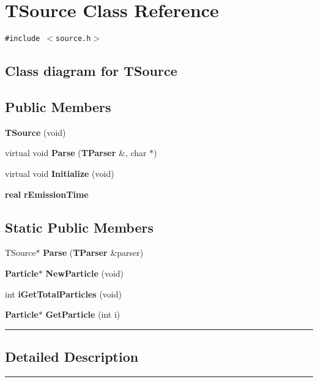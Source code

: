 \section{TSource  Class Reference}
\label{TSource}


{\tt \#include $<$source.h$>$}

\subsection*{Class diagram for TSource}
\begin{figure}[H]
\begin{center}
\leavevmode
\setlength{\epsfysize}{3cm}
\end{center}
\end{figure}
\subsection*{Public Members}
\begin{CompactItemize}
\item 
{\bf TSource} (void)
\item 
virtual void {\bf Parse} ({\bf TParser} \&, char $\ast$)
\item 
virtual void {\bf Initialize} (void)
\item 
{\bf real} {\bf r\-Emission\-Time}
\end{CompactItemize}
\subsection*{Static Public Members}
\begin{CompactItemize}
\item 
TSource$\ast$ {\bf Parse} ({\bf TParser} \&parser)
\item 
{\bf Particle}$\ast$ {\bf New\-Particle} (void)
\item 
int {\bf i\-Get\-Total\-Particles} (void)
\item 
{\bf Particle}$\ast$ {\bf Get\-Particle} (int i)
\end{CompactItemize}
\vspace{0.4cm}\hrule\vspace{0.2cm}
\subsection*{Detailed Description}
\vspace{0.4cm}\hrule\vspace{0.2cm}
